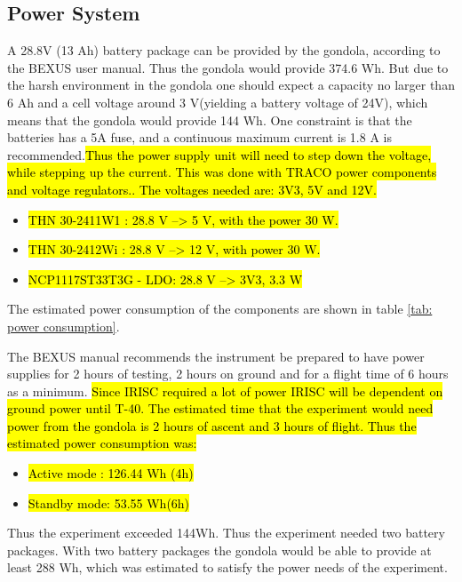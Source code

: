 \pagebreak
\subsection{Power System}

\label{sec:4.7}

A 28.8V (13 Ah) battery package can be provided by the gondola, according to the BEXUS user manual. Thus the gondola would provide 374.6 Wh. But due to the harsh environment in the gondola one should expect a capacity no larger than 6 Ah and a cell voltage around 3 V(yielding a battery voltage of 24V), which means that the gondola would provide 144 Wh. One constraint is that the batteries has a 5A fuse, and a continuous maximum current is 1.8 A is recommended.\hl{Thus the power supply unit will need to step down the voltage, while stepping up the current. This was done with TRACO power components and voltage regulators.. The voltages needed are: 3V3, 5V and 12V.}

\begin{itemize}
	\item \hl{ THN 30-2411W1 : 28.8 V --> 5 V, with the power 30 W.}
	\item \hl{THN 30-2412Wi : 28.8 V --> 12 V, with power 30 W.}
	\item \hl{NCP1117ST33T3G - LDO: 28.8 V --> 3V3, 3.3 W}
\end{itemize}


The estimated power consumption of the components are shown in table \ref{tab: power consumption}.



The BEXUS manual recommends the instrument be prepared to have power supplies for 2 hours of testing, 2 hours on ground and for a flight time of 6 hours as a minimum. \hl{Since IRISC required a lot of power IRISC will be dependent on ground power  until T-40. The estimated time that the experiment would need power from the gondola is 2 hours of ascent and 3 hours of flight. Thus the estimated power consumption was:  }

\begin{itemize}
    \item \hl{Active mode : 126.44 Wh (4h) }
    \item \hl{Standby mode: 53.55 Wh(6h)}
\end{itemize}

Thus the experiment exceeded 144Wh. Thus the experiment needed two battery packages. With two battery packages the gondola would be able to provide at least 288 Wh, which was estimated to satisfy the power needs of the experiment.



\raggedbottom
